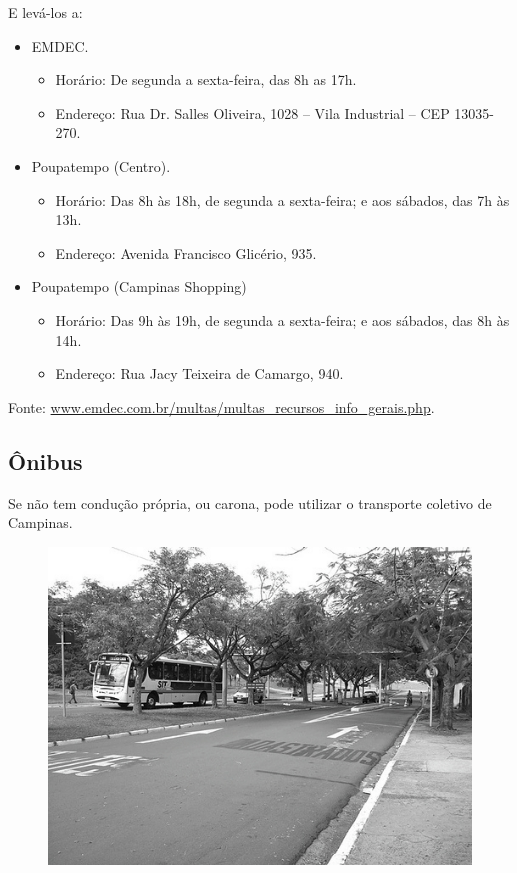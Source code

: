 E levá-los a:
\begin{itemize}
\item  EMDEC.
    \begin{itemize}
        \item  Horário: De segunda a sexta-feira, das 8h as 17h.
        \item  Endereço: Rua Dr. Salles Oliveira, 1028 -- Vila Industrial -- CEP 13035-270.
    \end{itemize}
\item  Poupatempo (Centro).
    \begin{itemize}
        \item  Horário: Das 8h às 18h, de segunda a sexta-feira; e aos sábados, das 7h às 13h.
        \item  Endereço: Avenida Francisco Glicério, 935.
    \end{itemize}
\item  Poupatempo (Campinas Shopping)
    \begin{itemize}
        \item  Horário: Das 9h às 19h, de segunda a sexta-feira; e aos sábados, das 8h às 14h.
        \item  Endereço: Rua Jacy Teixeira de Camargo, 940.
    \end{itemize}
\end{itemize}

Fonte: \url{www.emdec.com.br/multas/multas_recursos_info_gerais.php}.

\subsection{Ônibus}

Se não tem condução própria, ou carona, pode utilizar o transporte coletivo de
Campinas.

\begin{figure}[h!]
    \centering
    \includegraphics[scale=0.58,keepaspectratio=true]{img/imgs/8-transporte/-085.jpg}
\end{figure}


